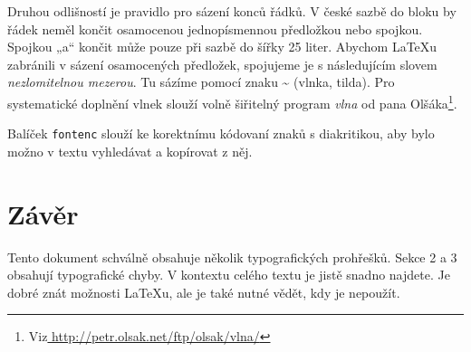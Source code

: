 \documentclass[a4paper,twocolumn,10pt]{article}
\begin{document}
Druhou odlišností je pravidlo pro sázení konců řádků. V české sazbě do bloku by řádek neměl končit osamocenou jednopísmennou předložkou nebo spojkou. Spojkou „a“ končit může pouze při sazbě do šířky 25 liter.
 Abychom \LaTeX u zabránili v sázení osamocených předložek, spojujeme je s následujícím slovem \emph{nezlomitelnou mezerou}. Tu sázíme pomocí znaku \~{} (vlnka, tilda). Pro systematické doplnění vlnek slouží volně šiřitelný program \emph{vlna} od pana Olšáka\footnote{Viz\href{http://petr.olsak.net/ftp/olsak/vlna/}{ http://petr.olsak.net/ftp/olsak/vlna/}}.
\par

Balíček \texttt{fontenc} slouží ke korektnímu kódovaní znaků
s diakritikou, aby bylo možno v textu vyhledávat a kopírovat z něj.

\section{Závěr}
Tento dokument schválně obsahuje několik typografických
prohřešků. Sekce 2 a 3 obsahují typografické chyby. V kontextu celého textu je jistě snadno najdete. Je dobré znát
možnosti \LaTeX u, ale je také nutné vědět, kdy je nepoužít.
\end{document}
